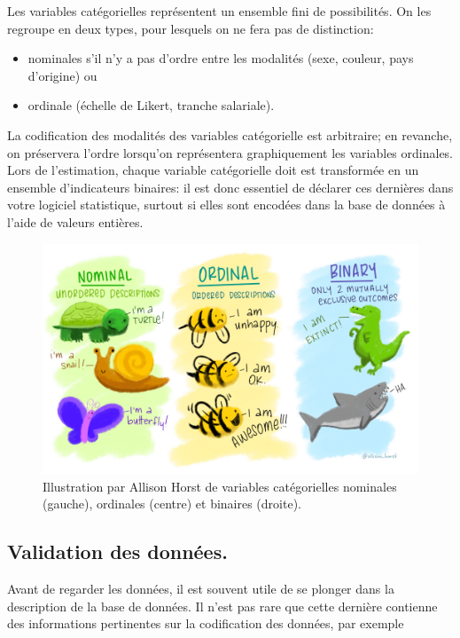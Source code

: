 \documentclass[
  11pt,
  letterpaper,
]{book}
\providecommand{\tightlist}{%
  \setlength{\itemsep}{0pt}\setlength{\parskip}{0pt}}
\theoremstyle{definition}
\theoremstyle{definition}
\theoremstyle{definition}
\theoremstyle{definition}
\theoremstyle{remark}
\begin{document}
Les variables catégorielles représentent un ensemble fini de possibilités. On les regroupe en deux types, pour lesquels on ne fera pas de distinction:

\begin{itemize}
\tightlist
\item
  nominales s'il n'y a pas d'ordre entre les modalités (sexe, couleur, pays d'origine) ou
\item
  ordinale (échelle de Likert, tranche salariale).
\end{itemize}

La codification des modalités des variables catégorielle est arbitraire; en revanche, on préservera l'ordre lorsqu'on représentera graphiquement les variables ordinales. Lors de l'estimation, chaque variable catégorielle doit est transformée en un ensemble d'indicateurs binaires: il est donc essentiel de déclarer ces dernières dans votre logiciel statistique, surtout si elles sont encodées dans la base de données à l'aide de valeurs entières.

\begin{figure}

{\centering \includegraphics[width=0.7\linewidth]{figures/nominal_ordinal_binary} 

}

\caption{Illustration par Allison Horst de variables catégorielles nominales (gauche), ordinales (centre) et binaires (droite).}\label{fig:variablescateg}
\end{figure}

\hypertarget{validation-des-donnuxe9es.}{%
\subsection{Validation des données.}\label{validation-des-donnuxe9es.}}

Avant de regarder les données, il est souvent utile de se plonger dans la description de la base de données. Il n'est pas rare que cette dernière contienne des informations pertinentes sur la codification des données, par exemple
\end{document}
